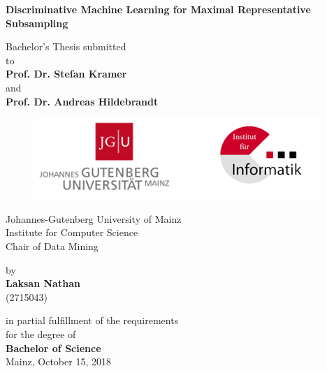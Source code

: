 \begin{center}

{\LARGE{\bf Discriminative Machine Learning for Maximal Representative Subsampling}} \vspace{1.0cm}



    {\normalsize Bachelor's Thesis submitted\\\vspace{0.5cm}
    to}\\\vspace{0.5cm}
    {\normalsize{\bf Prof. Dr. Stefan Kramer}} \\
    and \\
    {\normalsize{\bf Prof. Dr. Andreas Hildebrandt}} \\\vspace{1cm}
\begin{figure}[ht]
	\begin{center}
		\includegraphics[scale=0.70,angle=0]{fig/jgulogofigure}
	\end{center}
\end{figure}

    {\normalsize Johannes-Gutenberg University of Mainz \\
    Institute for Computer Science \\
    Chair of Data Mining} 

    {\normalsize by \\\vspace{0.5cm}
    {\bf Laksan Nathan} \\
    (2715043)} \vspace{1cm}


    {\normalsize in partial fulfillment of the requirements \\
    for the degree of \\
    {\bf Bachelor of Science} \\
    Mainz, October 15, 2018}

\end{center}
